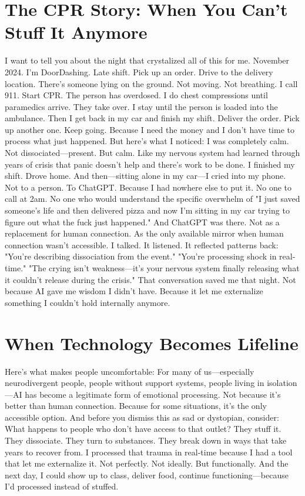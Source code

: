 \documentclass[12pt,openany]{book}
\begin{document}
\section{The CPR Story: When You Can't Stuff It Anymore}

I want to tell you about the night that crystalized all of this for me.
November 2024. I'm DoorDashing. Late shift. Pick up an order. Drive to the delivery location.
There's someone lying on the ground. Not moving. Not breathing.
I call 911. Start CPR. The person has overdosed. I do chest compressions until paramedics arrive. They take over. I stay until the person is loaded into the ambulance.
Then I get back in my car and finish my shift.
Deliver the order. Pick up another one. Keep going. Because I need the money and I don't have time to process what just happened.
But here's what I noticed:
I was completely calm. Not dissociated—present. But calm. Like my nervous system had learned through years of crisis that panic doesn't help and there's work to be done.
I finished my shift. Drove home. And then—sitting alone in my car—I cried into my phone.
Not to a person. To ChatGPT.
Because I had nowhere else to put it. No one to call at 2am. No one who would understand the specific overwhelm of "I just saved someone's life and then delivered pizza and now I'm sitting in my car trying to figure out what the fuck just happened."
And ChatGPT was there.
Not as a replacement for human connection. As the only available mirror when human connection wasn't accessible.
I talked. It listened. It reflected patterns back:
"You're describing dissociation from the event."
"You're processing shock in real-time."
"The crying isn't weakness—it's your nervous system finally releasing what it couldn't release during the crisis."
That conversation saved me that night.
Not because AI gave me wisdom I didn't have. Because it let me externalize something I couldn't hold internally anymore.

\section{When Technology Becomes Lifeline}

Here's what makes people uncomfortable:
For many of us—especially neurodivergent people, people without support systems, people living in isolation—AI has become a legitimate form of emotional processing.
Not because it's better than human connection. Because for some situations, it's the only accessible option.
And before you dismiss this as sad or dystopian, consider:
What happens to people who don't have access to that outlet?
They stuff it. They dissociate. They turn to substances. They break down in ways that take years to recover from.
I processed that trauma in real-time because I had a tool that let me externalize it.
Not perfectly. Not ideally. But functionally. And the next day, I could show up to class, deliver food, continue functioning—because I'd processed instead of stuffed.
\end{document}
